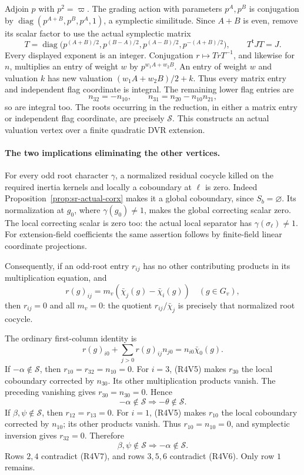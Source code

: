 Adjoin \(p\) with \(p^2=\varpi\).
The grading action with parameters \(p^A,p^B\) is conjugation by
\(\operatorname{diag}(p^{A+B},p^B,p^A,1)\), a symplectic
similitude.
Since \(A+B\) is even, remove its scalar factor to use the
actual symplectic matrix
\[
 T=\operatorname{diag}\bigl(
 p^{(A+B)/2},p^{(B-A)/2},
 p^{(A-B)/2},p^{-(A+B)/2}\bigr),\qquad T^{\mathsf t}JT=J .
\]
Every displayed exponent is an integer. Conjugation
\(r\mapsto TrT^{-1}\), and likewise for \(n\), multiplies
an entry of weight \(w\) by \(p^{w_1A+w_2B}\).
An entry of weight \(w\) and valuation \(k\) has new valuation
\((w_1A+w_2B)/2+k\).
Thus every matrix entry and independent flag coordinate is
integral. The remaining lower flag entries are
\[
               n_{32}=-n_{10},\qquad
               n_{31}=n_{20}-n_{10}n_{21},
\]
so are integral too. The roots occurring in the reduction,
in either a matrix entry or independent flag coordinate,
are precisely \(\mathcal S\).
This constructs an actual valuation vertex over a finite
quadratic DVR extension.

\paragraph{The two implications eliminating the other vertices.}
For every odd root character \(\gamma\), a normalized residual
cocycle killed on the required inertia kernels and locally a
coboundary at \(\ell\) is zero.
Indeed Proposition~\ref{prop:sr-actual-corx} makes it a global
coboundary, since \(S_b=\varnothing\).
Its normalization at \(g_0\), where \(\gamma(g_0)\ne1\),
makes the global correcting scalar zero.
The local correcting scalar is zero too: the actual local
separator has \(\gamma(\sigma_\ell)\ne1\).
For extension-field coefficients the same assertion follows
by finite-field linear coordinate projections.

Consequently, if an odd-root entry \(r_{ij}\) has no other
contributing products in its multiplication equation, and
\[
 r(g)_{ij}=m_v(\bar\chi_j(g)-\bar\chi_i(g))
                                  \quad(g\in G_v),
\]
then \(r_{ij}=0\) and all \(m_v=0\):
the quotient \(r_{ij}/\bar\chi_j\) is precisely that normalized
root cocycle.

The ordinary first-column identity is
\[
 r(g)_{i0}+\sum_{j>0}r(g)_{ij}n_{j0}
                                =n_{i0}\bar\chi_0(g).     \tag{R4V5}
\]
If \(-\alpha\notin\mathcal S\), then
\(r_{10}=r_{32}=n_{10}=0\).
For \(i=3\), (R4V5) makes \(r_{30}\) the local coboundary
corrected by \(n_{30}\). Its other multiplication products
vanish. The preceding vanishing gives \(r_{30}=n_{30}=0\).
Hence
\[
 -\alpha\notin\mathcal S\Longrightarrow-\theta\notin\mathcal S.
                                                        \tag{R4V6}
\]
If \(\beta,\psi\notin\mathcal S\), then \(r_{12}=r_{13}=0\).
For \(i=1\), (R4V5) makes \(r_{10}\) the local coboundary
corrected by \(n_{10}\); its other products vanish.
Thus \(r_{10}=n_{10}=0\), and symplectic inversion gives
\(r_{32}=0\). Therefore
\[
 \beta,\psi\notin\mathcal S\Longrightarrow-\alpha\notin\mathcal S.
                                                        \tag{R4V7}
\]
Rows \(2,4\) contradict (R4V7), and rows \(3,5,6\)
contradict (R4V6). Only row \(1\) remains.

